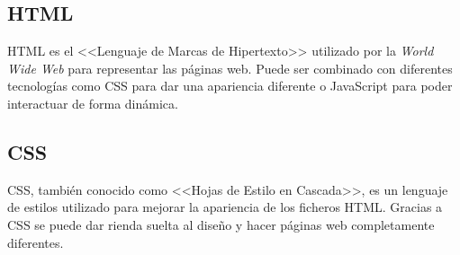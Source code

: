 \subsection{HTML}
HTML es el <<Lenguaje de Marcas de Hipertexto>> utilizado por la \textit{World Wide Web} para representar las páginas web. Puede ser combinado con diferentes tecnologías como CSS para dar una apariencia diferente o JavaScript para poder interactuar de forma dinámica.

\subsection{CSS}
CSS, también conocido como <<Hojas de Estilo en Cascada>>, es un lenguaje de estilos utilizado para mejorar la apariencia de los ficheros HTML. Gracias a CSS se puede dar rienda suelta al diseño y hacer páginas web completamente diferentes.

